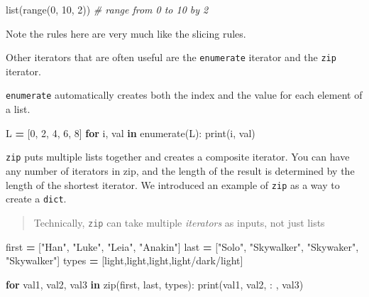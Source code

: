 \documentclass[
  letterpaper,
]{scrbook}
\newenvironment{Shaded}{\begin{snugshade}}{\end{snugshade}}
\newcommand{\BuiltInTok}[1]{#1}
\newcommand{\CommentTok}[1]{\textcolor[rgb]{0.56,0.35,0.01}{\textit{#1}}}
\newcommand{\ControlFlowTok}[1]{\textcolor[rgb]{0.13,0.29,0.53}{\textbf{#1}}}
\newcommand{\DecValTok}[1]{\textcolor[rgb]{0.00,0.00,0.81}{#1}}
\newcommand{\KeywordTok}[1]{\textcolor[rgb]{0.13,0.29,0.53}{\textbf{#1}}}
\newcommand{\NormalTok}[1]{#1}
\newcommand{\OperatorTok}[1]{\textcolor[rgb]{0.81,0.36,0.00}{\textbf{#1}}}
\newcommand{\StringTok}[1]{\textcolor[rgb]{0.31,0.60,0.02}{#1}}
\begin{document}
\begin{Shaded}
\begin{Highlighting}[]
\BuiltInTok{list}\NormalTok{(}\BuiltInTok{range}\NormalTok{(}\DecValTok{0}\NormalTok{, }\DecValTok{10}\NormalTok{, }\DecValTok{2}\NormalTok{))  }\CommentTok{\# range from 0 to 10 by 2}
\end{Highlighting}
\end{Shaded}

Note the rules here are very much like the slicing rules.

Other iterators that are often useful are the \texttt{enumerate} iterator and the \texttt{zip} iterator.

\texttt{enumerate} automatically creates both the index and the value for each element of a list.

\begin{Shaded}
\begin{Highlighting}[]
\NormalTok{L }\OperatorTok{=}\NormalTok{ [}\DecValTok{0}\NormalTok{, }\DecValTok{2}\NormalTok{, }\DecValTok{4}\NormalTok{, }\DecValTok{6}\NormalTok{, }\DecValTok{8}\NormalTok{]}
\ControlFlowTok{for}\NormalTok{ i, val }\KeywordTok{in} \BuiltInTok{enumerate}\NormalTok{(L):}
    \BuiltInTok{print}\NormalTok{(i, val)}
\end{Highlighting}
\end{Shaded}

\texttt{zip} puts multiple lists together and creates a composite iterator. You can have any number of iterators in zip, and the length of the result is determined by the length of the shortest iterator. We introduced an example of \texttt{zip} as a way to create a \texttt{dict}.

\begin{quote}
Technically, \texttt{zip} can take multiple \emph{iterators} as inputs, not just lists
\end{quote}

\begin{Shaded}
\begin{Highlighting}[]
\NormalTok{first }\OperatorTok{=}\NormalTok{ [}\StringTok{"Han"}\NormalTok{, }\StringTok{"Luke"}\NormalTok{, }\StringTok{"Leia"}\NormalTok{, }\StringTok{"Anakin"}\NormalTok{]}
\NormalTok{last }\OperatorTok{=}\NormalTok{ [}\StringTok{"Solo"}\NormalTok{, }\StringTok{"Skywalker"}\NormalTok{, }\StringTok{"Skywaker"}\NormalTok{, }\StringTok{"Skywalker"}\NormalTok{]}
\NormalTok{types }\OperatorTok{=}\NormalTok{ [}\StringTok{\textquotesingle{}light\textquotesingle{}}\NormalTok{,}\StringTok{\textquotesingle{}light\textquotesingle{}}\NormalTok{,}\StringTok{\textquotesingle{}light\textquotesingle{}}\NormalTok{,}\StringTok{\textquotesingle{}light/dark/light\textquotesingle{}}\NormalTok{]}

\ControlFlowTok{for}\NormalTok{ val1, val2, val3 }\KeywordTok{in} \BuiltInTok{zip}\NormalTok{(first, last, types):}
    \BuiltInTok{print}\NormalTok{(val1, val2, }\StringTok{\textquotesingle{} : \textquotesingle{}}\NormalTok{, val3)}
\end{Highlighting}
\end{Shaded}
\end{document}
